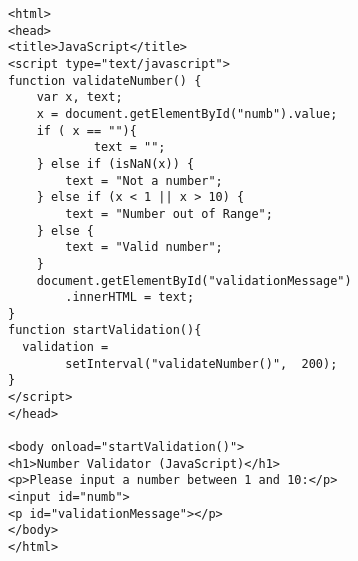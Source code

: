 \begin{verbatim}
<html>
<head>
<title>JavaScript</title>
<script type="text/javascript">
function validateNumber() {
    var x, text;
    x = document.getElementById("numb").value;
    if ( x == ""){
            text = "";
    } else if (isNaN(x)) {
        text = "Not a number";
    } else if (x < 1 || x > 10) {
        text = "Number out of Range";
    } else {
        text = "Valid number";
    }
    document.getElementById("validationMessage")
    	.innerHTML = text;
}
function startValidation(){
  validation = 
  		setInterval("validateNumber()",  200);
}
</script>
</head>

<body onload="startValidation()">
<h1>Number Validator (JavaScript)</h1>
<p>Please input a number between 1 and 10:</p>
<input id="numb">
<p id="validationMessage"></p>
</body>
</html>
\end{verbatim}
